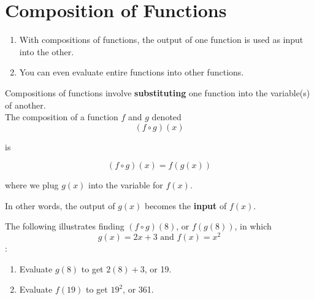 \documentclass{article}
\begin{document}
\section*{Composition of Functions}

\begin{tcolorbox}[colframe=orange!70!white, coltitle=black, title=\textbf{Summary}]
\begin{enumerate}
    \item With compositions of functions, the output of one function is used as input into the other.
    \item You can even evaluate entire functions into other functions.
\end{enumerate}
\end{tcolorbox}
\bigskip 

Compositions of functions involve {\color{blue}\textbf{substituting}} one function into the variable(s) of another.	\newline\\	

The composition of a function $f$ and $g$ denoted
\[ (f \circ g)(x) \]
\begin{center} is \end{center}
\[(f \circ g)(x) = f(g(x)) \]
\smallskip 

where we plug $g(x)$ into the variable for $f(x)$.	
\bigskip 

In other words, the output of $g(x)$ becomes the \textbf{input} of $f(x)$.
\vspace{0.25in}

The following illustrates finding $(f \circ g)(8)$, or $f(g(8))$, in which 
\[g(x)=2x+3 \text{ and } f(x) = x^2\]:		
\vspace{-12pt}

\begin{enumerate}
\item Evaluate $g(8)$ to get $2(8)+3$, or 19. 
\item Evaluate $f(19)$ to get $19^2$, or 361.
\end{enumerate}

\begin{center}
\end{center}
\vspace{1in}
\end{document}
